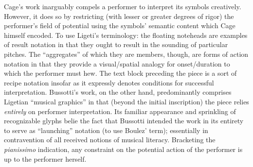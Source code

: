     Cage's work inarguably compels a performer to interpret its symbols creatively. However, it does so by restricting (with lesser or greater degrees of rigor) the performer's field of potential using the symbols' semantic content which Cage himself encoded. To use Ligeti's terminology: the floating noteheads are examples of result notation in that they ought to result in the sounding of particular pitches.  The ``aggregates'' of which they are members, though, are forms of action notation in that they provide a visual/spatial analogy for onset/duration to which the performer must hew. The text block preceding the piece is a sort of recipe notation insofar as it expressly denotes conditions for successful interpretation. Bussotti's work, on the other hand, predominantly comprises Ligetian ``musical graphics'' in that (beyond the initial inscription) the piece relies \textit{entirely} on performer interpretation. Its familiar appearance and sprinkling of recognizable glyphs belie the fact that Bussotti intended the work in its entirety to serve as ``launching'' notation (to use Boulez' term); essentially in contravention of all received notions of musical literacy. Bracketing the \textit{pianissimo} indication, any constraint on the potential action of the performer is up to the performer herself.

